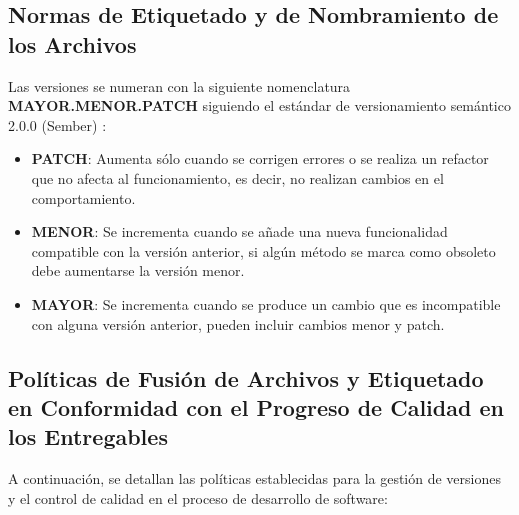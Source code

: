 \subsection{Normas de Etiquetado y de Nombramiento de los Archivos}\label{subsec:semantic_version}

Las versiones se numeran con la siguiente nomenclatura \textbf{MAYOR.MENOR.PATCH} siguiendo el estándar de versionamiento semántico 2.0.0 (Sember) \cite{semver}:
\begin{itemize}
    \item \textbf{PATCH}: Aumenta sólo cuando se corrigen errores o se realiza un refactor que no afecta al funcionamiento, es decir, no realizan cambios en el comportamiento.
    \item \textbf{MENOR}: Se incrementa cuando se añade una nueva funcionalidad compatible con la versión anterior, si algún método se marca como obsoleto debe aumentarse la versión menor.
    \item \textbf{MAYOR}: Se incrementa cuando se produce un cambio que es incompatible con alguna versión anterior, pueden incluir cambios menor y patch.
\end{itemize}


\subsection{Políticas de Fusión de Archivos y Etiquetado en Conformidad con el Progreso de Calidad en los Entregables}

A continuación, se detallan las políticas establecidas para la gestión de versiones y el control de calidad en el proceso de desarrollo de software:

